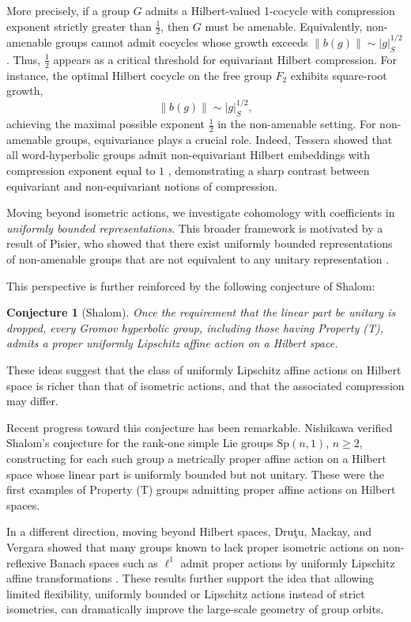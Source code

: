 \documentclass[12pt]{amsart}
\newtheorem{conjecture}[theorem]{Conjecture}
\theoremstyle{definition}
\begin{document}
More precisely, if a group \(G\) admits a Hilbert-valued 1-cocycle with
compression exponent strictly greater than \(\tfrac12\), then \(G\) must
be amenable. Equivalently, non-amenable groups cannot admit cocycles
whose growth exceeds \(\|b(g)\| \sim |g|_S^{1/2}\). Thus, \(\tfrac12\)
appears as a critical threshold for equivariant Hilbert compression. For
instance, the optimal Hilbert cocycle on the free group \(F_2\) exhibits
square-root growth, \[\|b(g)\| \sim |g|_{S}^{1/2},\] achieving the
maximal possible exponent \(\tfrac12\) in the non-amenable setting. For
non-amenable groups, equivariance plays a crucial role. Indeed, Tessera
showed that all word-hyperbolic groups admit non-equivariant Hilbert
embeddings with compression exponent equal to \(1\) \cite{Tessera2011},
demonstrating a sharp contrast between equivariant and non-equivariant
notions of compression.

Moving beyond isometric actions, we investigate cohomology with
coefficients in \emph{uniformly bounded representations}. This broader
framework is motivated by a result of Pisier, who showed that there
exist uniformly bounded representations of non-amenable groups that are
not equivalent to any unitary representation \cite{Pisier2001}.

This perspective is further reinforced by the following conjecture of Shalom:


\begin{conjecture}[Shalom{}]
Once the requirement that the linear part be unitary is dropped, every
Gromov hyperbolic group, including those having Property (T), admits a
proper uniformly Lipschitz affine action on a Hilbert space.
\end{conjecture}

These ideas suggest that the class of uniformly Lipschitz affine actions
on Hilbert space is richer than that of isometric actions,
and that the associated compression may differ.

Recent progress toward this conjecture has been remarkable. Nishikawa
\cite{Nishikawa2020_preprint} verified Shalom's conjecture for the
rank-one simple Lie groups \(\mathrm{Sp}(n,1)\), \(n \geq 2\),
constructing for each such group a metrically proper affine action on a
Hilbert space whose linear part is uniformly bounded but not unitary.
These were the first examples of Property (T) groups admitting proper
affine actions on Hilbert spaces.

In a different direction, moving beyond Hilbert spaces, Druţu, Mackay,
and Vergara showed that many groups known to lack proper isometric
actions on non-reflexive Banach spaces such as \(\ell^1\) admit proper
actions by uniformly Lipschitz affine transformations
\cite{Drutu2023_preprint} \cite{Vergara2023}. These results further
support the idea that allowing limited flexibility, uniformly bounded or
Lipschitz actions instead of strict isometries, can dramatically improve
the large-scale geometry of group orbits.
\end{document}
